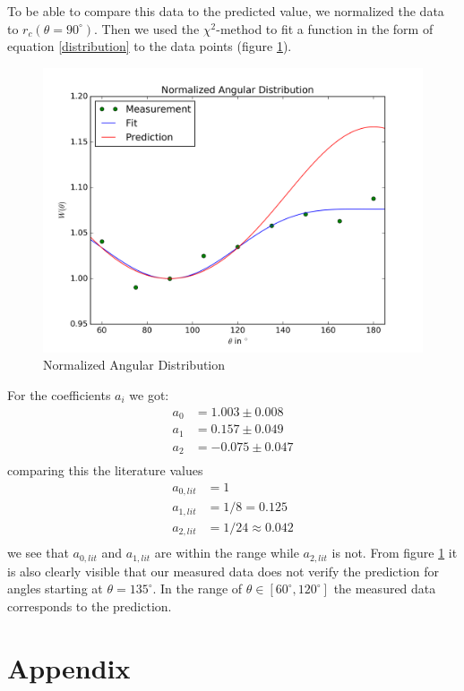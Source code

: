 \documentclass[a4paper,parskip,11pt, DIV12]{scrreprt}
\begin{document}
%
To be able to compare this data to the predicted value, we normalized the data to $r_{c}(\theta=90^{\circ})$. Then we used the $\chi^2$-method to fit a function in the form of equation \ref{distribution} to the data points (figure \ref{fig:distribution}).
%
\begin{figure}[H]
\centering
\includegraphics[scale=0.65]{dist.png}
\caption[Distribution]{Normalized Angular Distribution}
\label{fig:distribution}
\end{figure}
%
For the coefficients $a_i$ we got:
%
\begin{align*}
a_0 &= 1.003 \pm 0.008\\
a_1 &= 0.157 \pm 0.049\\
a_2 &= -0.075 \pm 0.047\\
\end{align*}
%
comparing this the literature values
%
\begin{align*}
a_{0,lit} &= 1\\
a_{1,lit} &= 1/8 = 0.125\\
a_{2,lit} &= 1/24 \approx 0.042\\
\end{align*}
%
we see that $a_{0,lit}$ and $a_{1,lit}$ are within the range while $a_{2,lit}$ is not. From figure \ref{fig:distribution} it is also clearly visible that our measured data does not verify the prediction for angles starting at $\theta=135^{\circ}$. In the range of $\theta \in \left[60^{\circ},120^{\circ}\right]$ the measured data corresponds to the prediction.


\chapter{Appendix}
\end{document}
